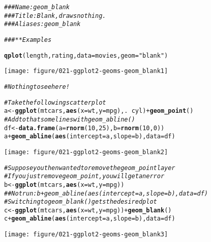 \documentclass[a4paper,titlepage]{tufte-handout}\usepackage[]{graphicx}\usepackage[]{color}
\makeatletter
\def\maxwidth{ %
  \ifdim\Gin@nat@width>\linewidth
    \linewidth
  \else
    \Gin@nat@width
  \fi
}
\newcommand{\hlnum}[1]{\textcolor[rgb]{0.686,0.059,0.569}{#1}}%
\newcommand{\hlstr}[1]{\textcolor[rgb]{0.192,0.494,0.8}{#1}}%
\newcommand{\hlcom}[1]{\textcolor[rgb]{0.678,0.584,0.686}{\textit{#1}}}%
\newcommand{\hlopt}[1]{\textcolor[rgb]{0,0,0}{#1}}%
\newcommand{\hlstd}[1]{\textcolor[rgb]{0.345,0.345,0.345}{#1}}%
\newcommand{\hlkwb}[1]{\textcolor[rgb]{0.69,0.353,0.396}{#1}}%
\newcommand{\hlkwc}[1]{\textcolor[rgb]{0.333,0.667,0.333}{#1}}%
\newcommand{\hlkwd}[1]{\textcolor[rgb]{0.737,0.353,0.396}{\textbf{#1}}}%
\newenvironment{kframe}{%
 \def\at@end@of@kframe{}%
 \ifinner\ifhmode%
  \def\at@end@of@kframe{\end{minipage}}%
  \begin{minipage}{\columnwidth}%
 \fi\fi%
 \def\FrameCommand##1{\hskip\@totalleftmargin \hskip-\fboxsep
 \colorbox{shadecolor}{##1}\hskip-\fboxsep
     \hskip-\linewidth \hskip-\@totalleftmargin \hskip\columnwidth}%
 \MakeFramed {\advance\hsize-\width
   \@totalleftmargin\z@ \linewidth\hsize
   \@setminipage}}%
 {\par\unskip\endMakeFramed%
 \at@end@of@kframe}
\newenvironment{knitrout}{}{} %
\makeatother
\begin{document}
\begin{knitrout}
\color{fgcolor}\begin{kframe}
\begin{alltt}
\hlcom{### Name: geom_blank}
\hlcom{### Title: Blank, draws nothing.}
\hlcom{### Aliases: geom_blank}

\hlcom{### ** Examples}

\hlkwd{qplot}\hlstd{(length, rating,} \hlkwc{data} \hlstd{= movies,} \hlkwc{geom} \hlstd{=} \hlstr{"blank"}\hlstd{)}
\end{alltt}
\end{kframe}
\texttt{[image: figure/021-ggplot2-geoms-geom\_blank1]} 
\begin{kframe}\begin{alltt}
\hlcom{# Nothing to see here!}

\hlcom{# Take the following scatter plot}
\hlstd{a} \hlkwb{<-} \hlkwd{ggplot}\hlstd{(mtcars,} \hlkwd{aes}\hlstd{(}\hlkwc{x} \hlstd{= wt,} \hlkwc{y} \hlstd{= mpg), .} \hlopt{~} \hlstd{cyl)} \hlopt{+} \hlkwd{geom_point}\hlstd{()}
\hlcom{# Add to that some lines with geom_abline()}
\hlstd{df} \hlkwb{<-} \hlkwd{data.frame}\hlstd{(}\hlkwc{a} \hlstd{=} \hlkwd{rnorm}\hlstd{(}\hlnum{10}\hlstd{,} \hlnum{25}\hlstd{),} \hlkwc{b} \hlstd{=} \hlkwd{rnorm}\hlstd{(}\hlnum{10}\hlstd{,} \hlnum{0}\hlstd{))}
\hlstd{a} \hlopt{+} \hlkwd{geom_abline}\hlstd{(}\hlkwd{aes}\hlstd{(}\hlkwc{intercept} \hlstd{= a,} \hlkwc{slope} \hlstd{= b),} \hlkwc{data} \hlstd{= df)}
\end{alltt}
\end{kframe}
\texttt{[image: figure/021-ggplot2-geoms-geom\_blank2]} 
\begin{kframe}\begin{alltt}
\hlcom{# Suppose you then wanted to remove the geom_point layer}
\hlcom{# If you just remove geom_point, you will get an error}
\hlstd{b} \hlkwb{<-} \hlkwd{ggplot}\hlstd{(mtcars,} \hlkwd{aes}\hlstd{(}\hlkwc{x} \hlstd{= wt,} \hlkwc{y} \hlstd{= mpg))}
\hlcom{## Not run: b + geom_abline(aes(intercept = a, slope = b), data = df)}
\hlcom{# Switching to geom_blank() gets the desired plot}
\hlstd{c} \hlkwb{<-} \hlkwd{ggplot}\hlstd{(mtcars,} \hlkwd{aes}\hlstd{(}\hlkwc{x} \hlstd{= wt,} \hlkwc{y} \hlstd{= mpg))} \hlopt{+} \hlkwd{geom_blank}\hlstd{()}
\hlstd{c} \hlopt{+} \hlkwd{geom_abline}\hlstd{(}\hlkwd{aes}\hlstd{(}\hlkwc{intercept} \hlstd{= a,} \hlkwc{slope} \hlstd{= b),} \hlkwc{data} \hlstd{= df)}
\end{alltt}
\end{kframe}
\texttt{[image: figure/021-ggplot2-geoms-geom\_blank3]} 
\begin{kframe}\begin{alltt}


\end{alltt}
\end{kframe}
\end{knitrout}
\end{document}
